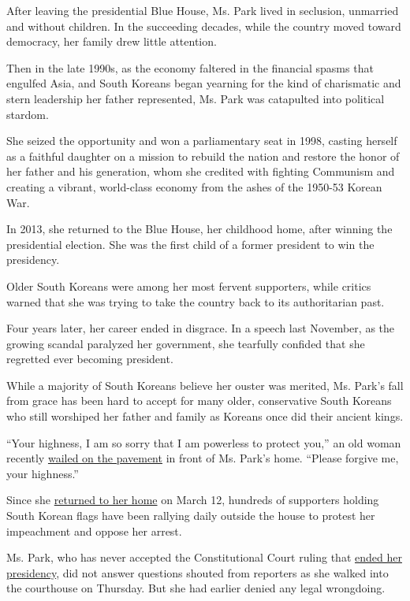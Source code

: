 After leaving the presidential Blue House, Ms. Park lived in seclusion,
unmarried and without children. In the succeeding decades, while the
country moved toward democracy, her family drew little attention.

Then in the late 1990s, as the economy faltered in the financial spasms
that engulfed Asia, and South Koreans began yearning for the kind of
charismatic and stern leadership her father represented, Ms. Park was
catapulted into political stardom.

She seized the opportunity and won a parliamentary seat in 1998, casting
herself as a faithful daughter on a mission to rebuild the nation and
restore the honor of her father and his generation, whom she credited
with fighting Communism and creating a vibrant, world-class economy from
the ashes of the 1950-53 Korean War.

In 2013, she returned to the Blue House, her childhood home, after
winning the presidential election. She was the first child of a former
president to win the presidency.

Older South Koreans were among her most fervent supporters, while
critics warned that she was trying to take the country back to its
authoritarian past.

Four years later, her career ended in disgrace. In a speech last
November, as the growing scandal paralyzed her government, she tearfully
confided that she regretted ever becoming president.

While a majority of South Koreans believe her ouster was merited, Ms.
Park's fall from grace has been hard to accept for many older,
conservative South Koreans who still worshiped her father and family as
Koreans once did their ancient kings.

``Your highness, I am so sorry that I am powerless to protect you,'' an
old woman recently
\href{http://www.wikitree.co.kr/main/news_view.php?id=295753}{wailed on
the pavement} in front of Ms. Park's home. ``Please forgive me, your
highness.''

Since she
\href{https://www.nytimes3xbfgragh.onion/2017/03/12/world/asia/park-geun-hye-blue-house.html}{returned
to her home} on March 12, hundreds of supporters holding South Korean
flags have been rallying daily outside the house to protest her
impeachment and oppose her arrest.

Ms. Park, who has never accepted the Constitutional Court ruling that
\href{https://www.nytimes3xbfgragh.onion/2017/03/09/world/asia/park-geun-hye-impeached-south-korea.html}{ended
her presidency}, did not answer questions shouted from reporters as she
walked into the courthouse on Thursday. But she had earlier denied any
legal wrongdoing.

